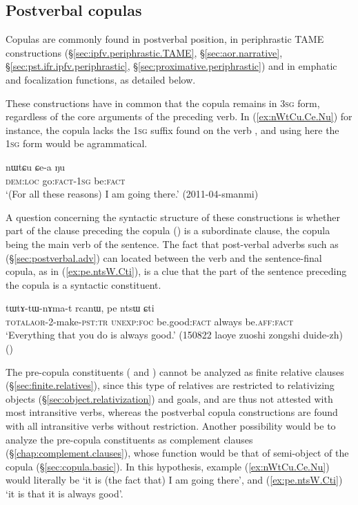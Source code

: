 
\subsection{Postverbal copulas}  \label{sec:postverbal.copulas}
Copulas are commonly found in postverbal position, in periphrastic TAME constructions (§\ref{sec:ipfv.periphrastic.TAME}, §\ref{sec:aor.narrative}, §\ref{sec:pst.ifr.ipfv.periphrastic}, §\ref{sec:proximative.periphrastic}) and in emphatic and focalization functions, as detailed below.

These constructions have in common that the copula remains in \textsc{3sg} form, regardless of the core arguments of the preceding verb. In (\ref{ex:nWtCu.Ce.Nu}) for instance, the copula  lacks the \textsc{1sg} suffix found on the verb , and using here the \textsc{1sg} form  would be agrammatical.


\begin{exe}
\ex \label{ex:nWtCu.Ce.Nu}
\gll nɯtɕu ɕe-a ŋu \\
\textsc{dem}:\textsc{loc} go:\textsc{fact}-\textsc{1sg} be:\textsc{fact} \\
\glt `(For all these reasons) I am going there.' (2011-04-smanmi)
\end{exe}

A question concerning the syntactic structure of these constructions is whether part of the clause preceding the copula () is a subordinate clause, the copula being the main verb of the sentence. The fact that post-verbal adverbs such as  (§\ref{sec:postverbal.adv}) can located between the verb and the sentence-final copula, as in (\ref{ex:pe.ntsW.Cti}), is a clue that the part of the sentence preceding the copula is a syntactic constituent.

\begin{exe}
\ex \label{ex:pe.ntsW.Cti}
\gll  tɯ\redp{}tɤ-tɯ-nɤma-t rcanɯ, pe ntsɯ ɕti\\
\textsc{total}\redp{}\textsc{aor}-2-make-\textsc{pst}:\textsc{tr} \textsc{unexp}:\textsc{foc} be.good:\textsc{fact} always be.\textsc{aff}:\textsc{fact}\\
\glt `Everything that you do is always good.' (150822 laoye zuoshi zongshi duide-zh)
()
\end{exe}

The pre-copula constituents ( and ) cannot be analyzed as finite relative clauses (§\ref{sec:finite.relatives}), since this type of relatives are restricted to relativizing objects (§\ref{sec:object.relativization}) and goals, and are thus not attested with most intransitive verbs, whereas the postverbal copula constructions are found with all intransitive verbs without restriction. Another possibility would be to analyze the pre-copula constituents as complement clauses (§\ref{chap:complement.clauses}), whose function would be that of semi-object of the copula (§\ref{sec:copula.basic}). In this hypothesis, example (\ref{ex:nWtCu.Ce.Nu}) would literally be `it is (the fact that) I am going there', and (\ref{ex:pe.ntsW.Cti}) `it is that it is always good'.

